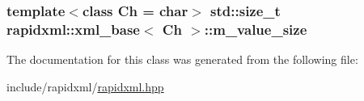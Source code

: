 \label{d4/d48/classrapidxml_1_1xml__base_a278a1ea63b0b70219b946cec47fa00ea}
\hypertarget{classrapidxml_1_1xml__base_aa3a49d8ceddb8a8d7edb773a2226b89c}{
\subsubsection[{m\_\-value\_\-size}]{\setlength{\rightskip}{0pt plus 5cm}template$<$class Ch = char$>$ std::size\_\-t {\bf rapidxml::xml\_\-base}$<$ Ch $>$::{\bf m\_\-value\_\-size}}}
\label{d4/d48/classrapidxml_1_1xml__base_aa3a49d8ceddb8a8d7edb773a2226b89c}


The documentation for this class was generated from the following file:\begin{DoxyCompactItemize}
\item 
include/rapidxml/\hyperlink{rapidxml_8hpp}{rapidxml.hpp}\end{DoxyCompactItemize}
